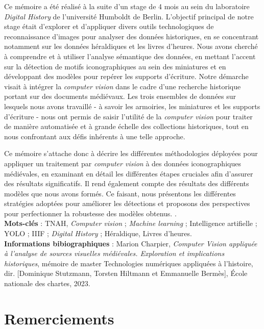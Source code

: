 \documentclass[12pt,twoside]{book}
\begin{document}
\medskip
Ce mémoire a été réalisé à la suite d’un stage de 4 mois au sein du laboratoire \textit{Digital History} de l’université Humboldt de Berlin. L'objectif principal de notre stage était d'explorer et d'appliquer divers outils technologiques de reconnaissance d'images pour analyser des données historiques, en se concentrant notamment sur les données héraldiques et les livres d'heures. Nous avons cherché à comprendre et à utiliser l'analyse sémantique des données, en mettant l'accent sur la détection de motifs iconographiques au sein des miniatures et en développant des modèles pour repérer les supports d'écriture. Notre démarche visait à intégrer la \textit{computer vision} dans le cadre d'une recherche historique portant sur des documents médiévaux. Les trois ensembles de données sur lesquels nous avons travaillé - à savoir les armoiries, les miniatures et les supports d'écriture - nous ont permis de saisir l'utilité de la \textit{computer vision }pour traiter de manière automatisée et à grande échelle des collections historiques, tout en nous confrontant aux défis inhérents à une telle approche.

Ce mémoire s’attache donc à décrire les différentes méthodologies déployées pour appliquer un traitement par \textit{computer vision} à des données iconographiques médiévales, en examinant en détail les différentes étapes cruciales afin d’assurer des résultats significatifs. Il rend également compte des résultats des différents modèles que nous avons formés. Ce faisant, nous présentons les différentes stratégies adoptées pour améliorer les détections et proposons des perspectives pour perfectionner la robustesse des modèles obtenus. 
.\\

\textbf{Mots-clés} : TNAH, \textit{Computer vision} ; \textit{Machine learning} ; Intelligence artifielle ; YOLO ; IIIF ; \textit{Digital History} ; Héraldique, Livres d'heures. \\

\textbf{Informations bibiographiques} : Marion Charpier, \textit{Computer Vision appliquée à l'analyse de sources visuelles médiévales. Exploration et implications historiques}, mémoire de master \og Technologies numériques appliquées à l'histoire\fg , dir. [Dominique Stutzmann, Torsten Hiltmann et Emmanuelle Bermès], École nationale des chartes, 2023.

\chapter{Remerciements}
\end{document}
